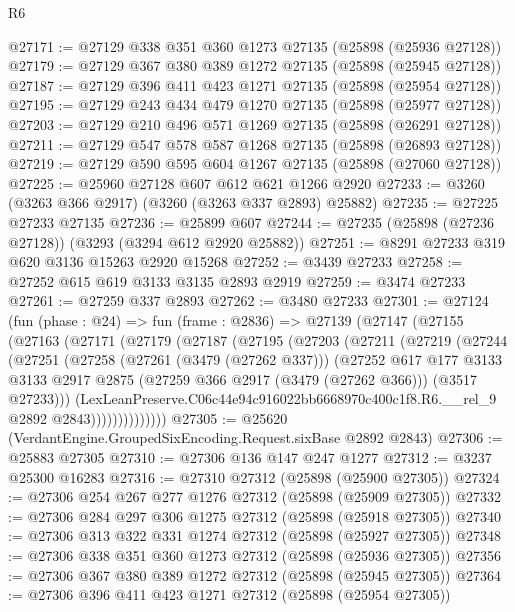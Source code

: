 \begin{lexlean}{R6}
\begin{coremodule}
@27171 := @27129 @338 @351 @360 @1273 @27135 (@25898 (@25936 @27128))
@27179 := @27129 @367 @380 @389 @1272 @27135 (@25898 (@25945 @27128))
@27187 := @27129 @396 @411 @423 @1271 @27135 (@25898 (@25954 @27128))
@27195 := @27129 @243 @434 @479 @1270 @27135 (@25898 (@25977 @27128))
@27203 := @27129 @210 @496 @571 @1269 @27135 (@25898 (@26291 @27128))
@27211 := @27129 @547 @578 @587 @1268 @27135 (@25898 (@26893 @27128))
@27219 := @27129 @590 @595 @604 @1267 @27135 (@25898 (@27060 @27128))
@27225 := @25960 @27128 @607 @612 @621 @1266 @2920
@27233 := @3260 (@3263 @366 @2917) (@3260 (@3263 @337 @2893) @25882)
@27235 := @27225 @27233 @27135
@27236 := @25899 @607
@27244 := @27235 (@25898 (@27236 @27128)) (@3293 (@3294 @612 @2920 @25882))
@27251 := @8291 @27233 @319 @620 @3136 @15263 @2920 @15268
@27252 := @3439 @27233
@27258 := @27252 @615 @619 @3133 @3135 @2893 @2919
@27259 := @3474 @27233
@27261 := @27259 @337 @2893
@27262 := @3480 @27233
@27301 := @27124
    (fun (phase : @24) =>
    fun (frame : @2836) =>
    @27139
      (@27147
        (@27155
          (@27163
            (@27171
              (@27179
                (@27187
                  (@27195
                    (@27203
                      (@27211
                        (@27219
                          (@27244
                            (@27251
                              (@27258
                                (@27261 (@3479 (@27262 @337)))
                                (@27252
                                  @617
                                  @177
                                  @3133
                                  @3133
                                  @2917
                                  @2875
                                  (@27259 @366 @2917 (@3479 (@27262 @366)))
                                  (@3517 @27233)))
                              (LexLeanPreserve.C06c44e94c916022bb6668970c400c1f8.R6.__rel_9
                                @2892
                                @2843))))))))))))))
@27305 := @25620 (VerdantEngine.GroupedSixEncoding.Request.sixBase @2892 @2843)
@27306 := @25883 @27305
@27310 := @27306 @136 @147 @247 @1277
@27312 := @3237 @25300 @16283
@27316 := @27310 @27312 (@25898 (@25900 @27305))
@27324 := @27306 @254 @267 @277 @1276 @27312 (@25898 (@25909 @27305))
@27332 := @27306 @284 @297 @306 @1275 @27312 (@25898 (@25918 @27305))
@27340 := @27306 @313 @322 @331 @1274 @27312 (@25898 (@25927 @27305))
@27348 := @27306 @338 @351 @360 @1273 @27312 (@25898 (@25936 @27305))
@27356 := @27306 @367 @380 @389 @1272 @27312 (@25898 (@25945 @27305))
@27364 := @27306 @396 @411 @423 @1271 @27312 (@25898 (@25954 @27305))

\end{coremodule}
\end{lexlean}
